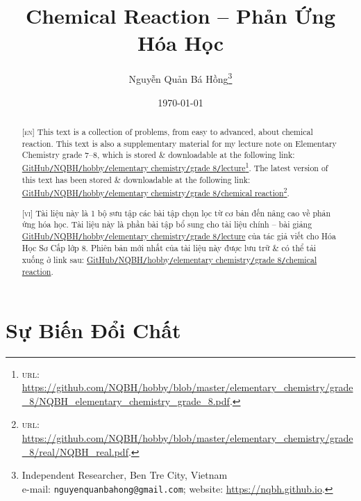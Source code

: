 \documentclass{article}
\title{Chemical Reaction -- Phản Ứng Hóa Học}
\author{Nguyễn Quản Bá Hồng\footnote{Independent Researcher, Ben Tre City, Vietnam\\e-mail: \texttt{nguyenquanbahong@gmail.com}; website: \url{https://nqbh.github.io}.}}
\date{\today}
\numberwithin{equation}{section}
\begin{document}
\maketitle
\begin{abstract}
	\textsc{[en]} This text is a collection of problems, from easy to advanced, about chemical reaction. This text is also a supplementary material for my lecture note on Elementary Chemistry grade 7--8, which is stored \& downloadable at the following link: \href{https://github.com/NQBH/hobby/blob/master/elementary_chemistry/grade_8/NQBH_elementary_chemistry_grade_8.pdf}{GitHub\texttt{/}NQBH\texttt{/}hobby\texttt{/}elementary chemistry\texttt{/}grade 8\texttt{/}lecture}\footnote{\textsc{url}: \url{https://github.com/NQBH/hobby/blob/master/elementary_chemistry/grade_8/NQBH_elementary_chemistry_grade_8.pdf}.}. The latest version of this text has been stored \& downloadable at the following link: \href{https://github.com/NQBH/hobby/blob/master/elementary_chemistry/grade_8/real/NQBH_real.pdf}{GitHub\texttt{/}NQBH\texttt{/}hobby\texttt{/}elementary chemistry\texttt{/}grade 8\texttt{/}chemical reaction}\footnote{\textsc{url}: \url{https://github.com/NQBH/hobby/blob/master/elementary_chemistry/grade_8/real/NQBH_real.pdf}.}.
	\vspace{2mm}
	
	\textsc{[vi]} Tài liệu này là 1 bộ sưu tập các bài tập chọn lọc từ cơ bản đến nâng cao về phản ứng hóa học. Tài liệu này là phần bài tập bổ sung cho tài liệu chính -- bài giảng \href{https://github.com/NQBH/hobby/blob/master/elementary_chemistry/grade_8/NQBH_elementary_chemistry_grade_8.pdf}{GitHub\texttt{/}NQBH\texttt{/}hobby\texttt{/}elementary chemistry\texttt{/}grade 8\texttt{/}lecture} của tác giả viết cho Hóa Học Sơ Cấp lớp 8. Phiên bản mới nhất của tài liệu này được lưu trữ \& có thể tải xuống ở link sau: \href{https://github.com/NQBH/hobby/blob/master/elementary_chemistry/grade_8/real/NQBH_real.pdf}{GitHub\texttt{/}NQBH\texttt{/}hobby\texttt{/}elementary chemistry\texttt{/}grade 8\texttt{/}chemical reaction}.
\end{abstract}
\setcounter{secnumdepth}{4}
\setcounter{tocdepth}{3}
\tableofcontents


\section{Sự Biến Đổi Chất}

\end{document}

